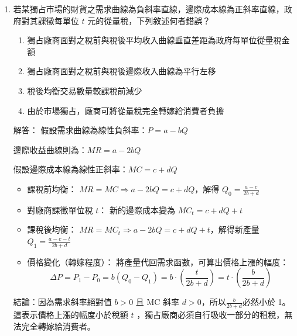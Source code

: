 \documentclass[12pt, a4paper]{article}
\begin{document}
\begin{enumerate}
    \item 若某獨占市場的財貨之需求曲線為負斜率直線，邊際成本線為正斜率直線，政府對其課徵每單位 \(t\) 元的從量稅，下列敘述何者錯誤？
    \begin{enumerate}[label=\Alph*.]
        \item 獨占廠商面對之稅前與稅後平均收入曲線垂直差距為政府每單位從量稅金額
        \item 獨占廠商面對之稅前與稅後邊際收入曲線為平行左移
        \item 稅後均衡交易數量較課稅前減少
        \item 由於市場獨占，廠商可將從量稅完全轉嫁給消費者負擔
    \end{enumerate}
    解答：
    假設需求曲線為線性負斜率：\(P = a - bQ\)

    邊際收益曲線則為：\(MR = a - 2bQ\)

    假設邊際成本線為線性正斜率：\(MC = c + dQ\)
    \begin{itemize}
        \item 課稅前均衡： \(MR = MC \Rightarrow a - 2bQ = c + dQ\)，解得 \(Q_0 = \frac{a - c}{2b + d}\)
        \item 對廠商課徵單位稅 \(t\)： 新的邊際成本變為 \(MC_t = c + dQ + t\)
        \item 課稅後均衡： \(MR = MC_t \Rightarrow a - 2bQ = c + dQ + t\)，解得新產量 \(Q_1 = \frac{a - c - t}{2b + d}\)
        \item 價格變化（轉嫁程度）：
    將產量代回需求函數，可算出價格上漲的幅度：
    \[
    \Delta P = P_1 - P_0 = b(Q_0 - Q_1) = b \cdot \left(\frac{t}{2b + d}\right) = t \cdot \left(\frac{b}{2b + d}\right)
    \]
    \end{itemize}
	結論：因為需求斜率絕對值 $b > 0$ 且 MC 斜率 $d > 0$，所以$ \frac{b}{2b + d}$必然小於 1。這表示價格上漲的幅度小於稅額 $t$ ，獨占廠商必須自行吸收一部分的租稅，無法完全轉嫁給消費者。


\end{enumerate}
\end{document}
